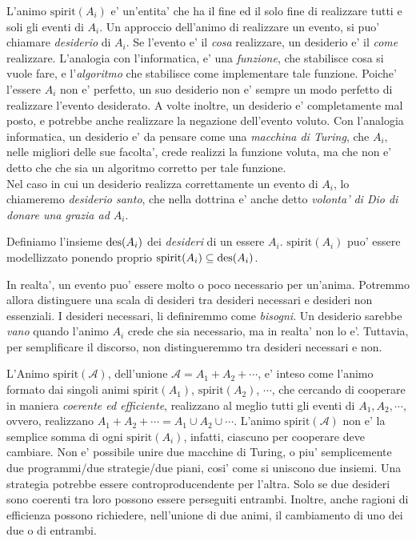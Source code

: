 \def\anima#1{\mathcal{#1}}

\def\spirit#1{\textrm{spirit}(#1)}
\def\Animo#1{\spirit{\anima{#1}}}
\def\saintspirit#1{\textrm{spirit}^*(#1)}

L'animo $\spirit{A_i}$ e' un'entita' che ha il fine ed il solo fine di realizzare tutti e soli gli eventi di $A_i$. Un approccio dell'animo di realizzare un evento, si puo' chiamare \emph{desiderio} di $A_i$. Se l'evento e' il \emph{cosa} realizzare, un desiderio e' il \emph{come} realizzare. L'analogia con l'informatica, e' una \emph{funzione}, che stabilisce cosa si vuole fare, e l'\emph{algoritmo} che stabilisce come implementare tale funzione. Poiche' l'essere $A_i$ non e' perfetto, un suo desiderio non e' sempre un modo perfetto di realizzare l'evento desiderato. A volte inoltre, un desiderio e' completamente mal posto, e potrebbe anche realizzare la negazione dell'evento voluto. Con l'analogia informatica, un desiderio e' da pensare come una \emph{macchina di Turing}, che $A_i$, nelle migliori delle sue facolta', crede realizzi la funzione voluta, ma che non e' detto che che sia un algoritmo corretto per tale funzione. \\
Nel caso in cui un desiderio realizza correttamente un evento di $A_i$, lo chiameremo \emph{desiderio santo}, che nella dottrina e' anche detto \emph{volonta' di Dio di donare una grazia ad $A_i$}.

Definiamo l'insieme $\textrm{des}(A_i)$ dei \emph{desideri} di un essere $A_i$. $\spirit{A_i}$ puo' essere modellizzato ponendo proprio $\spirit{A_i}\subseteq\des(A_i)$. 

In realta', un evento puo' essere molto o poco necessario per un'anima. Potremmo allora distinguere una scala di desideri tra desideri necessari e desideri non essenziali. I desideri necessari, li definiremmo come \emph{bisogni}. Un desiderio sarebbe \emph{vano} quando l'animo $A_i$ crede che sia necessario, ma in realta' non lo e'. Tuttavia, per semplificare il discorso, non distingueremmo tra desideri necessari e non.

L'Animo $\Animo{A}$, dell'unione $\anima{A}=A_1+A_2+\cdots$, e' inteso come l'animo formato dai singoli animi $\spirit{A_1}$, $\spirit{A_2}$, $\cdots$, che cercando di cooperare in maniera \emph{coerente ed efficiente}, realizzano al meglio tutti gli eventi di $A_1,A_2,\cdots$, ovvero, realizzano $A_1+A_2+\cdots=A_1\cup A_2\cup \cdots$. L'animo $\Animo{A}$ non e' la semplice somma di ogni $\spirit{A_i}$, infatti, ciascuno per cooperare deve cambiare. Non e' possibile unire due macchine di Turing, o piu' semplicemente due programmi/due strategie/due piani, cosi' come si uniscono due insiemi. Una strategia potrebbe essere controproducendente per l'altra. Solo se due desideri sono coerenti tra loro possono essere perseguiti entrambi. Inoltre, anche ragioni di efficienza possono richiedere, nell'unione di due animi, il cambiamento di uno dei due o di entrambi.
\\

